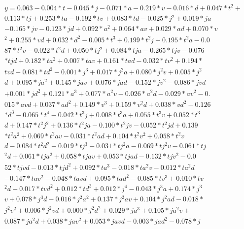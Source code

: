 \begin{align}
  y = 0.063 -0.004 * t -0.045 * j -0.071 * a -0.219 * v -0.016 * d + 0.047 * t^2 + \\
   0.113 * t j + 0.253 * t a -0.192 * t v + 0.083 * t d -0.025 * j^2 + 0.019 * j a \\
   -0.165 * j v -0.123 * j d + 0.092 * a^2 + 0.064 * a v + 0.029 * a d + 0.070 * v \\
  ^2 + 0.255 * v d + 0.032 * d^2 -0.005 * t^3 + 0.199 * t^2 j + 0.195 * t^2 a -0.0 \\
  87 * t^2 v -0.022 * t^2 d + 0.050 * t j^2 + 0.084 * t j a -0.265 * t j v -0.076  \\
  * t j d + 0.182 * t a^2 + 0.007 * t a v + 0.161 * t a d -0.032 * t v^2 + 0.194 * \\
   t v d -0.081 * t d^2 -0.001 * j^3 + 0.017 * j^2 a + 0.080 * j^2 v + 0.005 * j^2 \\
   d + 0.095 * j a^2 + 0.145 * j a v + 0.076 * j a d -0.152 * j v^2 -0.086 * j v d \\
   + 0.001 * j d^2 + 0.121 * a^3 + 0.077 * a^2 v -0.026 * a^2 d -0.029 * a v^2 -0. \\
  015 * a v d + 0.037 * a d^2 + 0.149 * v^3 + 0.159 * v^2 d + 0.038 * v d^2 -0.126 \\
   * d^3 -0.065 * t^4 -0.042 * t^3 j + 0.008 * t^3 a + 0.055 * t^3 v + 0.052 * t^3 \\
   d + 0.147 * t^2 j^2 + 0.136 * t^2 j a -0.100 * t^2 j v -0.052 * t^2 j d + 0.139 \\
   * t^2 a^2 + 0.069 * t^2 a v -0.031 * t^2 a d + 0.104 * t^2 v^2 + 0.058 * t^2 v  \\
  d -0.084 * t^2 d^2 -0.019 * t j^3 -0.031 * t j^2 a -0.069 * t j^2 v -0.061 * t j \\
  ^2 d + 0.061 * t j a^2 + 0.058 * t j a v + 0.053 * t j a d -0.132 * t j v^2 -0.0 \\
  52 * t j v d -0.013 * t j d^2 + 0.092 * t a^3 -0.018 * t a^2 v -0.012 * t a^2 d  \\
  -0.147 * t a v^2 -0.048 * t a v d + 0.095 * t a d^2 -0.085 * t v^3 + 0.010 * t v \\
  ^2 d -0.017 * t v d^2 + 0.012 * t d^3 + 0.012 * j^4 -0.043 * j^3 a + 0.174 * j^3 \\
   v + 0.078 * j^3 d -0.016 * j^2 a^2 + 0.137 * j^2 a v + 0.104 * j^2 a d -0.018 * \\
   j^2 v^2 + 0.006 * j^2 v d + 0.000 * j^2 d^2 + 0.029 * j a^3 + 0.105 * j a^2 v + \\
   0.087 * j a^2 d + 0.038 * j a v^2 + 0.053 * j a v d -0.003 * j a d^2 -0.078 * j \\

\end{align}
